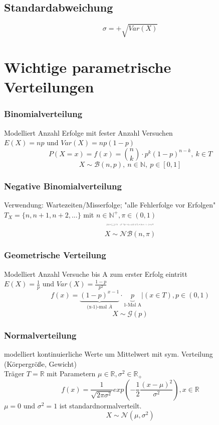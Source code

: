 \documentclass[10pt,a4paper,landscape]{article}
\begin{document}
\begin{multicols}{4}
\subsection{Standardabweichung}
\[
\sigma = + \sqrt{Var(X)}
\]


\section{Wichtige parametrische Verteilungen}

\subsubsection{Binomialverteilung}
Modelliert Anzahl Erfolge mit fester Anzahl Versuchen\\
$E(X)=np$ und $Var(X)=np(1-p)$
\[
P(X=x)=f(x)=\binom{n}{k} \cdot p^k(1-p)^{n-k}, ~ k \in T 
\]
\[
X \sim \mathcal{B}(n, p), ~ n \in \mathbb{N}, ~p \in [0,1]
\]

\subsubsection{Negative Binomialverteilung}
Verwendung: Wartezeiten/Misserfolge; "alle Fehlerfolge vor Erfolgen" \\
$T_X=\{n, n+1, n+2, ...\}$ mit $n \in \mathbb{N}^+, \pi \in (0,1)$
\[\resizebox{0.2\textwidth}{!}{$
f(x)=\binom{x-1}{n-1}\pi ^n(1-\pi)^{x-n}|(x \geq n), \pi \in (0,1), T_X=\{n, n+1, ...\} ~ n \in \mathbb{N}^+
$}
\]
\[
X \sim \mathcal{NB}(n, \pi)
\]

\subsubsection{Geometrische Verteilung}
Modelliert Anzahl Versuche bis A zum erster Erfolg eintritt\\
$E(X)=\frac{1}{p}$ und $Var(X)=\frac{1-p}{p^2}$
\[
f(x)= \underbrace{(1 - p)^{x-1}}_{\text{(x-1)-mal } \overline{A}}
 \cdot \underbrace{p}_{\text{1-Mal A}}|(x \in T), p \in (0,1)
\]
\[
X \sim \mathcal{G}(p)
\]

\subsubsection{Normalverteilung}
modelliert kontinuierliche Werte um Mittelwert mit sym. Verteilung (Körpergröße, Gewicht) \\
Träger $T=\mathbb{R}$ mit Parametern $\mu \in \mathbb{R}, \sigma^2 \in \mathbb{R}_+$
\[
f(x)=\frac{1}{\sqrt{2 \pi \sigma^2}}exp\left(-\frac{1}{2}\frac{(x-\mu)^2}{\sigma^2}\right), x\in \mathbb{R}
\]
$\mu = 0$ und $\sigma^2 = 1$ ist standardnormalverteilt.
\[
X \sim \mathcal{N}(\mu , \sigma^2)
\]


\end{multicols}
\end{document}
